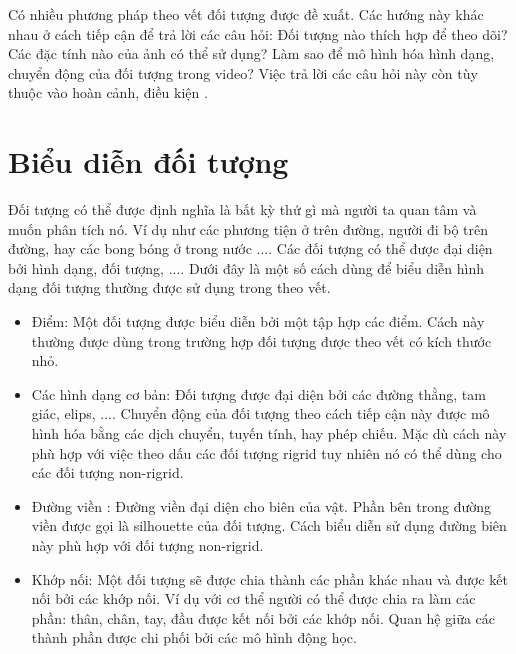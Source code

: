 \documentclass[12pt, oneside, a4paper]{book}
\begin{document}
Có nhiều phương pháp theo vết đối tượng được đề xuất. Các hướng này khác nhau ở cách tiếp cận để trả lời các câu hỏi: Đối tượng nào thích hợp để theo dõi? Các đặc tính nào của ảnh có thể sử dụng? Làm sao để mô hình hóa hình dạng, chuyển động của đối tượng trong video? Việc trả lời các câu hỏi này còn tùy thuộc vào hoàn cảnh, điều kiện .
\section{Biểu diễn đối tượng }
Đối tượng có thể được định nghĩa là bất kỳ thứ gì mà người ta quan tâm và muốn phân tích nó. Ví dụ như các phương tiện ở trên đường, người đi bộ trên đường, hay các bong bóng ở trong nước .... Các đối tượng có thể được đại diện bởi hình dạng, đối tượng, .... Dưới đây là một số cách dùng để biểu diễn hình dạng đối tượng thường được sử dụng trong  theo vết. 
\begin{itemize}
\item Điểm: Một đối tượng được biểu diễn bởi một tập hợp các điểm. Cách này thường được dùng trong trường hợp đối tượng được theo vết có kích thước nhỏ.
\item Các hình dạng cơ bản: Đối tượng được đại diện bởi các đường thằng, tam giác, elips, .... Chuyển động của đối tượng theo cách tiếp cận này được mô hình hóa bằng các dịch chuyển, tuyến tính, hay phép chiếu. Mặc dù cách này phù hợp với việc theo dấu các đối tượng rigrid tuy nhiên nó có thể dùng cho các đối tượng non-rigrid.
\item Đường viền : Đường viền đại diện cho biên của vật. Phần bên trong đường viền được gọi là silhouette của đối tượng. Cách biểu diễn sử dụng đường biên này phù hợp với đối tượng non-rigrid.
\item Khớp nối: Một đối tượng sẽ được chia thành các phần khác nhau và được kết nối bởi các khớp nối. Ví dụ với cơ thể người có thể được chia ra làm các phần: thân, chân, tay,  đầu được kết nối bởi các khớp nối. Quan hệ giữa các thành phần được chi phối bởi các mô hình động học.
\end{itemize}
\end{document}
